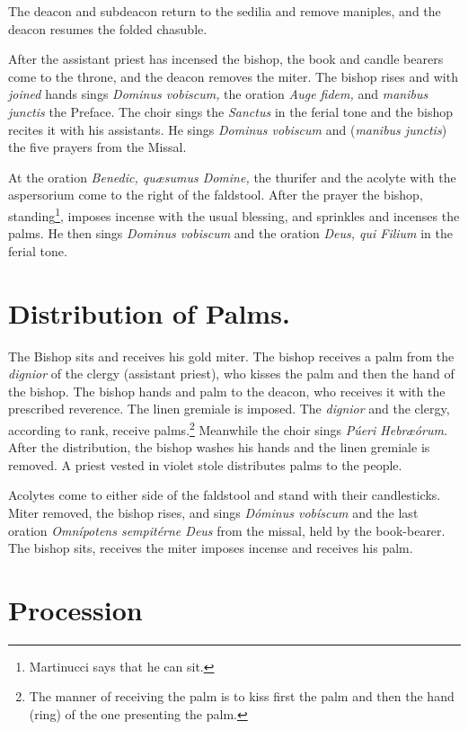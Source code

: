 {\rubric The deacon and subdeacon return to the sedilia and remove maniples, and
the deacon resumes the folded chasuble.

\rubric After the assistant priest has incensed the bishop, the book and candle
bearers come to the throne, and the deacon removes the miter. The bishop rises
and with \textit{joined} hands sings \textit{Dominus vobiscum,} the oration
\textit{Auge fidem,} and \textit{manibus junctis} the Preface. The choir sings
the \textit{Sanctus} in the ferial tone and the bishop recites it with his
assistants. He sings \textit{Dominus vobiscum} and (\textit{manibus junctis})
the five prayers from the Missal.

\rubric At the oration \textit{Benedic, qu\ae sumus Domine,} the thurifer and
the acolyte with the aspersorium come to the right of the faldstool. After the
prayer the bishop, standing\footnote{Martinucci says that he can sit.}, imposes
incense with the usual blessing, and sprinkles and incenses the palms. He then
sings \textit{Dominus vobiscum} and the oration \textit{Deus, qui Filium} in
the ferial tone.

\section{Distribution of Palms.}

\rubric The Bishop sits and receives his gold miter. The bishop receives a palm
from the \textit{dignior} of the clergy (assistant priest), who kisses the palm
and then the hand of the bishop. The bishop hands and palm to the deacon, who
receives it with the prescribed reverence. The linen gremiale is imposed. The
\textit{dignior} and the clergy, according to rank, receive palms.\footnote{The
manner of receiving the palm is to kiss first the palm and then the hand (ring)
of the one presenting the palm.} Meanwhile the choir sings \textit{Púeri
Hebr\ae órum.} After the distribution, the bishop washes his hands and the
linen gremiale is removed. A priest vested in violet stole distributes palms to
the people. 

\rubric Acolytes come to either side of the faldstool and stand with their
candlesticks. Miter removed, the bishop rises, and sings \textit{Dóminus
vobíscum} and the last oration \textit{Omnípotens sempitérne Deus} from the
missal, held by the book-bearer. The bishop sits, receives the miter imposes
incense and receives his palm.

\section{Procession}

}
